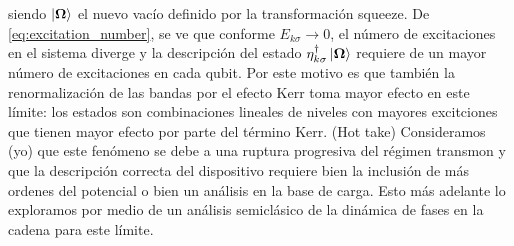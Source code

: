 siendo $\ket{\mathbf{\Omega}}$ el nuevo vacío definido por la transformación squeeze. De \eqref{eq:excitation_number}, se ve que conforme $E_{k\sigma} \rightarrow 0$, el número de excitaciones en el sistema diverge y la descripción del estado $\eta_{k\sigma}^\dag \ket{\mathbf{\Omega}}$ requiere de un mayor número de excitaciones en cada qubit. Por este motivo es que también la renormalización de las bandas por el efecto Kerr toma mayor efecto en este límite: los estados son combinaciones lineales de niveles con mayores excitciones que tienen mayor efecto por parte del término Kerr. (Hot take) Consideramos (yo) que este fenómeno se debe a una ruptura progresiva del régimen transmon y que la descripción correcta del dispositivo requiere bien la inclusión de más ordenes del potencial o bien un análisis en la base de carga. Esto más adelante lo exploramos por medio de un análisis semiclásico de la dinámica de fases en la cadena para este límite.

